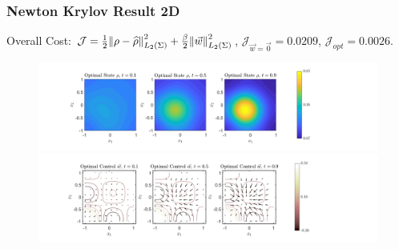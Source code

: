 \documentclass[aspectratio=169,xcolor=dvipsnames]{beamer}
\begin{document}
\begin{frame}
	\frametitle{Newton Krylov Result 2D}
	\vspace{0.3cm}
	Overall Cost: $\mathcal J = \frac{1}{2}\norm{\rho- \widehat{\rho}}_{L_2(\Sigma)}^2 + \frac{\beta}{2} \norm{\vec{w}}_{L_2(\Sigma)}^2$, $\mathcal J_{\vec{w} = \vec 0} = 0.0209$, $\mathcal J_{opt} = 0.0026$.
	\begin{figure}
		\includegraphics[width=13.5cm]{FCNkn1.png}
		\includegraphics[width=13.5cm]{FCNkn1c.png}
	\end{figure}
\end{frame}
\end{document}
